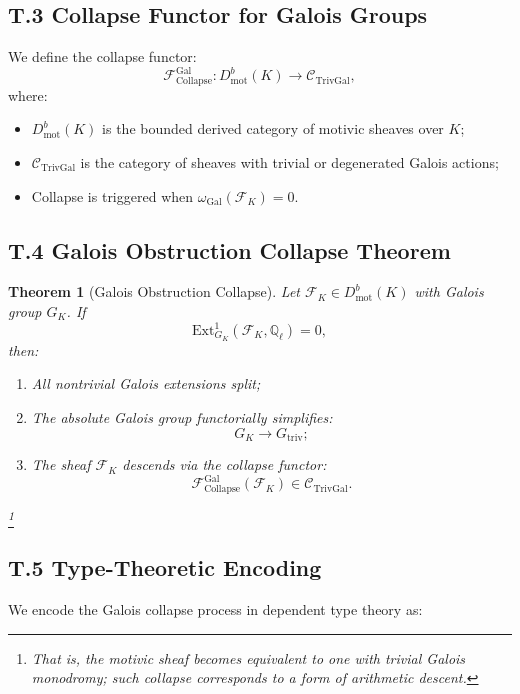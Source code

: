 \documentclass[11pt]{article}
\newtheorem{theorem}{Theorem}[section]
\begin{document}
\subsection*{T.3 Collapse Functor for Galois Groups}

We define the collapse functor:
\[
\mathcal{F}_{\mathrm{Collapse}}^{\mathrm{Gal}} : D^b_{\mathrm{mot}}(K) \longrightarrow \mathcal{C}_{\mathrm{TrivGal}},
\]
where:
\begin{itemize}
    \item $D^b_{\mathrm{mot}}(K)$ is the bounded derived category of motivic sheaves over $K$;
    \item $\mathcal{C}_{\mathrm{TrivGal}}$ is the category of sheaves with trivial or degenerated Galois actions;
    \item Collapse is triggered when $\omega_{\mathrm{Gal}}(\mathcal{F}_K) = 0$.
\end{itemize}

\subsection*{T.4 Galois Obstruction Collapse Theorem}

\begin{theorem}[Galois Obstruction Collapse]
Let $\mathcal{F}_K \in D^b_{\mathrm{mot}}(K)$ with Galois group $G_K$. If
\[
\mathrm{Ext}^1_{G_K}(\mathcal{F}_K, \mathbb{Q}_\ell) = 0,
\]
then:
\begin{enumerate}
    \item All nontrivial Galois extensions split;
    \item The absolute Galois group functorially simplifies:
    \[
    G_K \longrightarrow G_{\mathrm{triv}};
    \]
    \item The sheaf $\mathcal{F}_K$ descends via the collapse functor:
    \[
    \mathcal{F}_{\mathrm{Collapse}}^{\mathrm{Gal}}(\mathcal{F}_K) \in \mathcal{C}_{\mathrm{TrivGal}}.
    \]
\end{enumerate}

\footnote{That is, the motivic sheaf becomes equivalent to one with trivial Galois monodromy; such collapse corresponds to a form of arithmetic descent.}
\end{theorem}

\subsection*{T.5 Type-Theoretic Encoding}

We encode the Galois collapse process in dependent type theory as:
\end{document}
